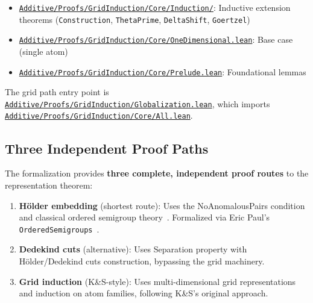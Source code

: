 \documentclass[11pt]{article}
\theoremstyle{definition}
\theoremstyle{remark}
\begin{document}
\begin{itemize}
\begin{itemize}
  \item \href{https://github.com/zariuq/ks-foundations-of-inference/tree/main/KnuthSkilling/Additive/Proofs/GridInduction/Core/Induction/}{\texttt{Additive/Proofs/GridInduction/Core/Induction/}}: Inductive extension theorems (\texttt{Construction}, \texttt{ThetaPrime}, \texttt{DeltaShift}, \texttt{Goertzel})
  \item \href{https://github.com/zariuq/ks-foundations-of-inference/blob/main/KnuthSkilling/Additive/Proofs/GridInduction/Core/OneDimensional.lean}{\texttt{Additive/Proofs/GridInduction/Core/OneDimensional.lean}}: Base case (single atom)
  \item \href{https://github.com/zariuq/ks-foundations-of-inference/blob/main/KnuthSkilling/Additive/Proofs/GridInduction/Core/Prelude.lean}{\texttt{Additive/Proofs/GridInduction/Core/Prelude.lean}}: Foundational lemmas
  \end{itemize}
\end{itemize}

The grid path entry point is \href{https://github.com/zariuq/ks-foundations-of-inference/blob/main/KnuthSkilling/Additive/Proofs/GridInduction/Globalization.lean}{\texttt{Additive/Proofs/GridInduction/Globalization.lean}}, which imports \href{https://github.com/zariuq/ks-foundations-of-inference/blob/main/KnuthSkilling/Additive/Proofs/GridInduction/Core/All.lean}{\texttt{Additive/Proofs/GridInduction/Core/All.lean}}.

\subsection{Three Independent Proof Paths}

The formalization provides \textbf{three complete, independent proof routes} to the representation theorem:

\begin{enumerate}
\item \textbf{Hölder embedding} (shortest route): Uses the NoAnomalousPairs condition and
classical ordered semigroup theory~\cite{Holder1901,Alimov1950,Fuchs1963}.
Formalized via Eric Paul's \texttt{OrderedSemigroups}~\cite{Paul2024}.

\item \textbf{Dedekind cuts} (alternative): Uses Separation property with Hölder/Dedekind cuts construction,
bypassing the grid machinery.

\item \textbf{Grid induction} (K\&S-style): Uses multi-dimensional grid representations and induction on atom families,
following K\&S's original approach.
\end{enumerate}
\end{document}
